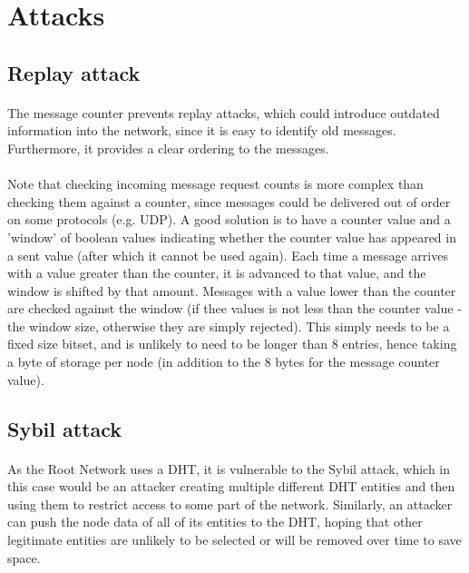 \documentclass{article}
\begin{document}
\section{Attacks}

\subsection{Replay attack}

\paragraph{}
The message counter prevents replay attacks, which could introduce outdated information into the network, since it is easy to identify old messages. Furthermore, it provides a clear ordering to the messages.

\paragraph{}
Note that checking incoming message request counts is more complex than checking them against a counter, since messages could be delivered out of order on some protocols (e.g. UDP). A good solution is to have a counter value and a 'window' of boolean values indicating whether the counter value has appeared in a sent value (after which it cannot be used again). Each time a message arrives with a value greater than the counter, it is advanced to that value, and the window is shifted by that amount. Messages with a value lower than the counter are checked against the window (if thee values is not less than the counter value - the window size, otherwise they are simply rejected). This simply needs to be a fixed size bitset, and is unlikely to need to be longer than 8 entries, hence taking a byte of storage per node (in addition to the 8 bytes for the message counter value).

\subsection{Sybil attack}

\paragraph{}
As the Root Network uses a DHT, it is vulnerable to the Sybil attack, which in this case would be an attacker creating multiple different DHT entities and then using them to restrict access to some part of the network. Similarly, an attacker can push the node data of all of its entities to the DHT, hoping that other legitimate entities are unlikely to be selected or will be removed over time to save space.
\end{document}
